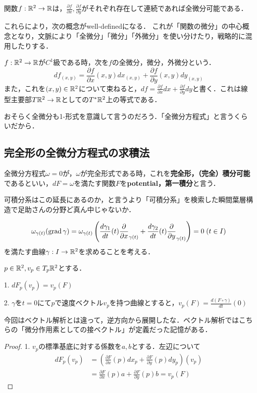 \documentclass[uplatex,dvipdfmx]{jsreport}
\begin{document}
\begin{theorem}[全微分可能の十分性条件]
    関数$f:\mathbb{R}^2\to\mathbb{R}$は，$\frac{\partial f}{\partial x},\frac{\partial f}{\partial y}$がそれぞれ存在して連続であれば全微分可能である．
\end{theorem}

これらにより，次の概念がwell-definedになる．
これが「関数の微分」の中心概念となり，文脈により「全微分」「微分」「外微分」を使い分けたり，戦略的に混用したりする．
\begin{definition}
    $f:\mathbb{R}^2\to\mathbb{R}$が$C^1$級である時，次を$f$の全微分，微分，外微分という．
    \[ df_{(x,y)} = \frac{\partial f}{\partial x}(x,y)dx_{(x,y)}+\frac{\partial f}{\partial y}(x,y)dy_{(x,y)} \]
    また，これを$(x,y)\in\mathbb{R}^2$について束ねると，$df=\frac{\partial f}{\partial x}dx+\frac{\partial f}{\partial y}dy$と書く．これは線型主要部$T\mathbb{R}^2\to \mathbb{R}$としての$T^*\mathbb{R}^2$上の等式である．
\end{definition}
おそらく全微分も1-形式を意識して言うのだろう．「全微分方程式」と言うくらいだから．

\subsection{完全形の全微分方程式の求積法}

\begin{definition}[完全な全微分方程式]
    全微分方程式$\omega=0$が，$\omega$が完全形式である時，これを\textbf{完全形，（完全）積分可能}であるといい，$dF=\omega$を満たす関数$F$を\textbf{potential，第一積分}と言う．
\end{definition}
可積分系はこの延長にあるのか，と言うより「可積分系」を検索した瞬間葉層構造で足助さんの分野ど真ん中じゃないか．

\[ \omega_{\gamma(t)} (\operatorname{\mathrm{grad}}\gamma) = \omega_{\gamma(t)}\left(\frac{d\gamma_1}{dt}(t)\frac{\partial}{\partial x}_{\gamma(t)} + \frac{d\gamma_2}{dt}(t)\frac{\partial}{\partial y}_{\gamma(t)}\right) =0\;(t\in I) \]
を満たす曲線$\gamma:I\to\mathbb{R}^2$を求めることを考える．

\begin{lemma}[方向微分の特徴付け]
    $p\in\mathbb{R}^2,v_p\in T_p\mathbb{R}^2$とする．

    1. $dF_p(v_p)=v_p(F)$

    2. $\gamma$を$t=0$にて$p$で速度ベクトル$v_p$を持つ曲線とすると，$v_p(F)=\frac{d(F\circ\gamma)}{dt}(0)$
\end{lemma}
今回はベクトル解析とは違って，逆方向から展開したな．ベクトル解析ではこちらの「微分作用素としての接ベクトル」が定義だった記憶がある．
\begin{proof}
    1. $v_p$の標準基底に対する係数を$a,b$とする．左辺について
    \begin{align*}
        dF_p(v_p) &= \left( \frac{\partial F}{\partial x}(p)dx_p + \frac{\partial F}{\partial y}(p)dy_p \right)(v_p)\\
        &= \frac{\partial F}{\partial x}(p)a + \frac{\partial F}{\partial y}(p)b = v_p(F)
    \end{align*}
\end{proof}
\end{document}

